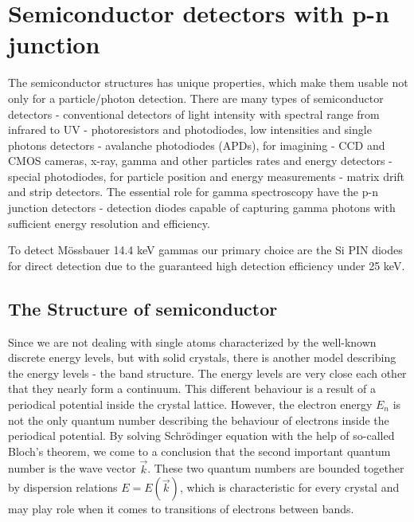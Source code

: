 
\chapter{Semiconductor detectors with p-n junction}
The semiconductor structures has unique properties, which make them usable not only for a particle/photon detection. There are many types of semiconductor detectors - conventional detectors of light intensity with spectral range from infrared to UV - photoresistors and photodiodes, low intensities and single photons detectors - avalanche photodiodes (APDs), for imagining - CCD and CMOS cameras, x-ray, gamma and other particles rates and energy detectors - special photodiodes, for particle position and energy measurements - matrix drift and strip detectors. The essential role for gamma spectroscopy have the p-n junction detectors - detection diodes capable of capturing gamma photons with sufficient energy resolution and efficiency.

\par
To detect Mössbauer 14.4 keV gammas our primary choice are the Si PIN diodes for direct detection due to the guaranteed high detection efficiency under 25 keV. 

\section{The Structure of semiconductor}
Since we are not dealing with single atoms characterized by the well-known discrete energy levels, but with solid crystals, there is another  model describing the energy levels - the band structure. The energy levels are very close each other that they nearly form a continuum. This different behaviour is a result of a periodical potential inside the crystal lattice. However, the electron energy $E_{n}$ is not the only quantum number describing the behaviour of electrons inside the periodical potential. By solving Schrödinger equation with the help of so-called Bloch's theorem, we come to a conclusion that the second important quantum number is the wave vector $\vec{k}$. These two quantum numbers are bounded together by dispersion relations $E = E(\vec{k})$, which is characteristic for every crystal and may play role when it comes to transitions of electrons between bands.

